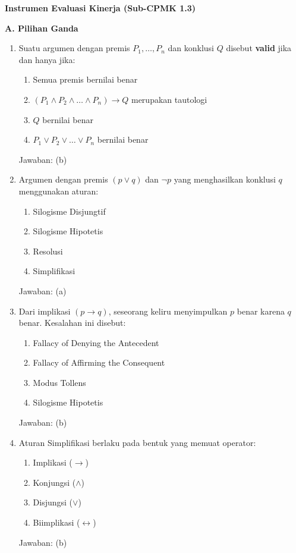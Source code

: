 \documentclass[../main]{subfiles}
\begin{document}
\begin{asesmen}
\textbf{Instrumen Evaluasi Kinerja (Sub-CPMK 1.3)}

\textbf{A. Pilihan Ganda}
\begin{enumerate}
  \item Suatu argumen dengan premis $P_1, \ldots, P_n$ dan konklusi $Q$ disebut \textbf{valid} jika dan hanya jika:
  \begin{enumerate}
    \item Semua premis bernilai benar
    \item $(P_1 \wedge P_2 \wedge \ldots \wedge P_n) \rightarrow Q$ merupakan tautologi
    \item $Q$ bernilai benar
    \item $P_1 \vee P_2 \vee \ldots \vee P_n$ bernilai benar
  \end{enumerate}
  Jawaban: (b)

  \item Argumen dengan premis $(p \vee q)$ dan $\neg p$ yang menghasilkan konklusi $q$ menggunakan aturan:
  \begin{enumerate}
    \item Silogisme Disjungtif
    \item Silogisme Hipotetis
    \item Resolusi
    \item Simplifikasi
  \end{enumerate}
  Jawaban: (a)

  \item Dari implikasi $(p \rightarrow q)$, seseorang keliru menyimpulkan $p$ benar karena $q$ benar. Kesalahan ini disebut:
  \begin{enumerate}
    \item Fallacy of Denying the Antecedent
    \item Fallacy of Affirming the Consequent
    \item Modus Tollens
    \item Silogisme Hipotetis
  \end{enumerate}
  Jawaban: (b)

  \item Aturan Simplifikasi berlaku pada bentuk yang memuat operator:
  \begin{enumerate}
    \item Implikasi ($\rightarrow$)
    \item Konjungsi ($\wedge$)
    \item Disjungsi ($\vee$)
    \item Biimplikasi ($\leftrightarrow$)
  \end{enumerate}
  Jawaban: (b)


\end{enumerate}
\end{asesmen}
\end{document}
